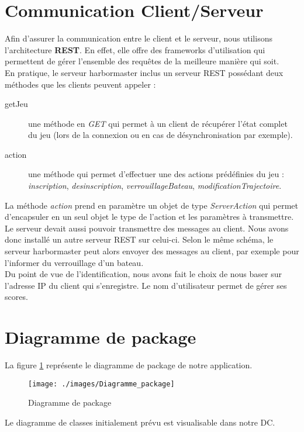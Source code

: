 
\section{Communication Client/Serveur}

Afin d'assurer la communication entre le client et le serveur, nous utilisons l'architecture \textbf{REST}. En effet, elle offre des frameworks d'utilisation qui permettent de gérer l'ensemble des requêtes de la meilleure manière qui soit.\\

En pratique, le serveur harbormaster inclus un serveur REST possédant deux méthodes que les clients peuvent appeler :
\begin{description}
	\item[getJeu] une méthode en \emph{GET} qui permet à un client de récupérer l'état complet du jeu (lors de la connexion ou en cas de désynchronisation par exemple).
	\item[action] une méthode qui permet d'effectuer une des actions prédéfinies du jeu : \emph{inscription}, \emph{desinscription}, \emph{verrouillageBateau}, \emph{modificationTrajectoire}.
\end{description}

La méthode \emph{action} prend en paramètre un objet de type \emph{ServerAction} qui permet d'encapsuler en un seul objet le type de l'action et les paramètres à transmettre.\\

Le serveur devait aussi pouvoir transmettre des messages au client. Nous avons donc installé un autre serveur REST sur celui-ci. Selon le même schéma, le serveur harbormaster peut alors envoyer des messages au client, par exemple pour l'informer du verrouillage d'un bateau.\\

Du point de vue de l'identification, nous avons fait le choix de nous baser sur l'adresse IP du client qui s'enregistre. Le nom d'utilisateur permet de gérer ses scores.

\section{Diagramme de package}

La figure \ref{fig:package} représente le diagramme de package de notre application. 
\begin{figure}[htbp]
  \centering
 \texttt{[image: ./images/Diagramme\_package]} 
  \caption{Diagramme de package}
  \label{fig:package}
\end{figure}


Le diagramme de classes initialement prévu est visualisable dans notre DC. 